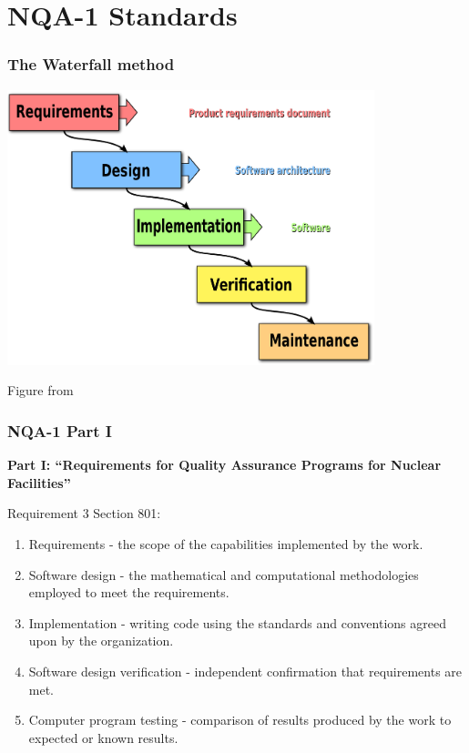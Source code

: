 \documentclass[12pt]{beamer}
\begin{document}
\section{NQA-1 Standards}

\begin{frame}[fragile]
\frametitle{The Waterfall method \cite{waterfall}}
\centerline{\includegraphics[width=0.8\textwidth]{figures/waterfall.pdf}}
Figure from \cite{waterfall_wiki}
\end{frame}

\begin{frame}
\frametitle{NQA-1 Part I}

{\bf Part I: ``Requirements for Quality Assurance Programs for Nuclear Facilities''}

Requirement 3 Section 801:
\begin{enumerate}
\item{\alert{Requirements} - the scope of the capabilities implemented by the work.}
\item{\alert{Software design} - the mathematical and computational methodologies employed to meet the requirements.}
\item{\alert{Implementation} - writing code using the standards and conventions agreed upon by the organization.}
\item{\alert{Software design verification} - independent confirmation that requirements are met.}
\item{\alert{Computer program testing} - comparison of results produced by the work to expected or known results.}
\end{enumerate}
\end{frame}
\end{document}
